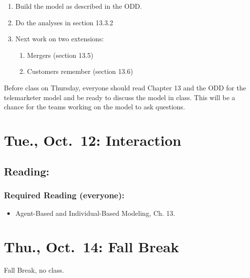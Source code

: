 \documentclass[
]{article}
\providecommand{\tightlist}{%
  \setlength{\itemsep}{0pt}\setlength{\parskip}{0pt}}
\begin{document}
\begin{enumerate}
\def\labelenumi{\arabic{enumi}.}
\tightlist
\item
  Build the model as described in the ODD.
\item
  Do the analyses in section 13.3.2
\item
  Next work on two extensions:

  \begin{enumerate}
  \def\labelenumii{\arabic{enumii}.}
  \tightlist
  \item
    Mergers (section 13.5)
  \item
    Customers remember (section 13.6)
  \end{enumerate}
\end{enumerate}

Before class on Thursday, everyone should read Chapter 13 and the ODD
for the telemarketer model and be ready to discuss the model in class.
This will be a chance for the teams working on the model to ask
questions.

\hypertarget{tue.-oct.-12-interaction}{%
\section{Tue., Oct.~12: Interaction}\label{tue.-oct.-12-interaction}}

\hypertarget{reading-13}{%
\subsection{Reading:}\label{reading-13}}

\hypertarget{required-reading-everyone-12}{%
\subsubsection{Required Reading
(everyone):}\label{required-reading-everyone-12}}

\begin{itemize}
\tightlist
\item
  Agent-Based and Individual-Based Modeling, Ch. 13.
\end{itemize}

\hypertarget{thu.-oct.-14-fall-break}{%
\section{Thu., Oct.~14: Fall Break}\label{thu.-oct.-14-fall-break}}

Fall Break, no class.
\end{document}
